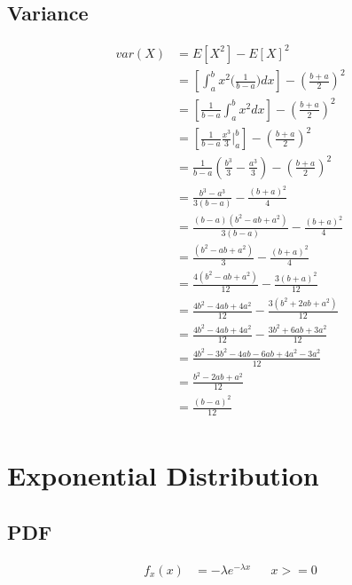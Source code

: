 \documentclass[]{article}
\begin{document}
\subsection{Variance}
\begin{align*}
var(X) &= E[X^2] - E[X]^2\\
&= [\int_{a}^{b} {x^2\big( \frac{1}{b-a} \big)dx}] - (\frac{b+a}{2})^2\\
&= [\frac{1}{b-a}\int_{a}^{b} {x^2dx}] - (\frac{b+a}{2})^2\\
&= [\frac{1}{b-a}\frac{x^3}{3}|_{a}^{b}] - (\frac{b+a}{2})^2\\
&= \frac{1}{b-a}(\frac{b^3}{3}-\frac{a^3}{3}) - (\frac{b+a}{2})^2\\
&= \frac{b^3-a^3}{3(b-a)} - \frac{(b+a)^2}{4}\\
&= \frac{(b-a)(b^2-ab+a^2)}{3(b-a)} - \frac{(b+a)^2}{4}\\
&= \frac{(b^2-ab+a^2)}{3} - \frac{(b+a)^2}{4}\\
&= \frac{4(b^2-ab+a^2)}{12} - \frac{3(b+a)^2}{12}\\
&= \frac{4b^2-4ab+4a^2}{12} - \frac{3(b^2+2ab+a^2)}{12}\\
&= \frac{4b^2-4ab+4a^2}{12} - \frac{3b^2+6ab+3a^2}{12}\\
&= \frac{4b^2-3b^2-4ab-6ab+4a^2-3a^2}{12}\\
&= \frac{b^2-2ab+a^2}{12}\\
&= \frac{(b-a)^2}{12}\\
\end{align*}

\pagebreak
\section {Exponential Distribution}
\subsection{PDF}
\begin{align*}
f_x(x) &= -\lambda e^{-\lambda x} && x >= 0
\end{align*}
\end{document}
